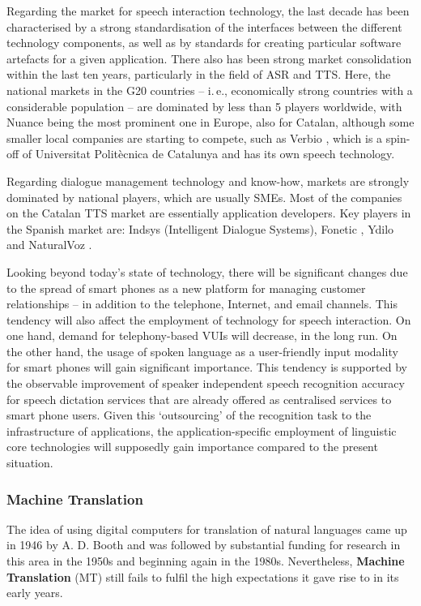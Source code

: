 \begin{multicols}{2}
Regarding the market for speech interaction technology, the last decade has been characterised by a strong standardisation of the interfaces between the different technology components, as well as by standards for creating particular software artefacts for a given application. There also has been strong market consolidation within the last ten years, particularly in the field of ASR and TTS. Here, the national markets in the G20 countries -- i.\,e., economically strong countries with a considerable population -- are dominated by less than 5 players worldwide, with Nuance being the most prominent one in Europe, also for Catalan, although some smaller local companies are starting to compete, such as Verbio \cite{CAT-Nota25}, which is a spin-off of Universitat Politècnica de Catalunya and has its own speech technology. 

Regarding dialogue management technology and know-how, markets are strongly dominated by national players, which are usually SMEs. Most of the companies on the Catalan TTS market are essentially application developers. Key players in the Spanish market are: Indsys \cite{CAT-Nota26} (Intelligent Dialogue Systems), Fonetic \cite{CAT-Nota27}, Ydilo \cite{CAT-Nota28} and NaturalVoz \cite{CAT-Nota29}.

Looking beyond today’s state of technology, there will be significant changes due to the spread of smart phones as a new platform for managing customer relationships -- in addition to the telephone, Internet, and email channels. This tendency will also affect the employment of technology for speech interaction. On one hand, demand for telephony-based VUIs will decrease, in the long run. On the other hand, the usage of spoken language as a user-friendly input modality for smart phones will gain significant importance. This tendency is supported by the observable improvement of speaker independent speech recognition accuracy for speech dictation services that are already offered as centralised services to smart phone users. Given this ‘outsourcing’ of the recognition task to the infrastructure of applications, the application-specific employment of linguistic core technologies will supposedly gain importance compared to the present situation. 

\subsubsection{Machine Translation}

The idea of using digital computers for translation of natural languages came up in 1946 by A. D. Booth and was followed by substantial funding for research in this area in the 1950s and beginning again in the 1980s. Nevertheless, \textbf{Machine Translation} (MT) still fails to fulfil the high expectations it gave rise to in its early years. 


\end{multicols}
